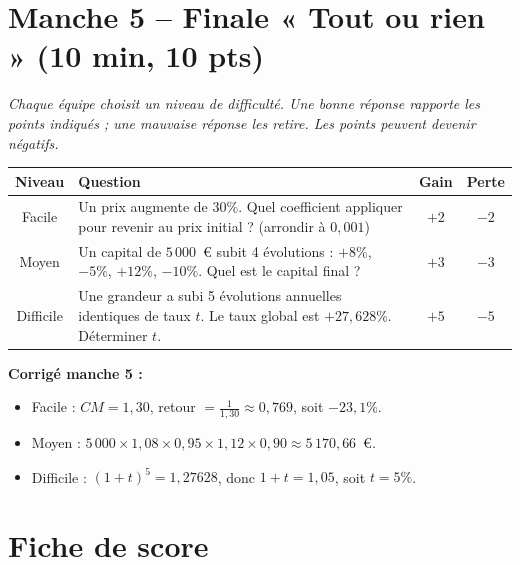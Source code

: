 \documentclass[12pt,a4paper]{article}
\begin{document}
\newpage

\section*{Manche 5 -- Finale « Tout ou rien » (10 min, 10 pts)}

\textit{Chaque équipe choisit un niveau de difficulté. Une bonne réponse rapporte les points indiqués ; une mauvaise réponse les retire. Les points peuvent devenir négatifs.}

\vspace{0.3cm}

\begin{center}
\renewcommand{\arraystretch}{1.5}
\begin{tabular}{|c|p{9cm}|c|c|}
\hline
\textbf{Niveau} & \textbf{Question} & \textbf{Gain} & \textbf{Perte} \\
\hline
Facile & Un prix augmente de \(30\%\). Quel coefficient appliquer pour revenir au prix initial ? (arrondir à \(0{,}001\)) & \(+2\) & \(-2\) \\
\hline
Moyen & Un capital de \(5\,000\)~\euro{} subit 4 évolutions : \(+8\%\), \(-5\%\), \(+12\%\), \(-10\%\). Quel est le capital final ? & \(+3\) & \(-3\) \\
\hline
Difficile & Une grandeur a subi 5 évolutions annuelles identiques de taux \(t\). Le taux global est \(+27{,}628\%\). Déterminer \(t\). & \(+5\) & \(-5\) \\
\hline
\end{tabular}
\end{center}

\vspace{0.3cm}
\textbf{Corrigé manche 5 :}
\begin{itemize}
    \item Facile : \(CM = 1{,}30\), retour \(= \frac{1}{1{,}30} \approx 0{,}769\), soit \(-23{,}1\%\).
    \item Moyen : \(5\,000 \times 1{,}08 \times 0{,}95 \times 1{,}12 \times 0{,}90 \approx 5\,170{,}66\)~\euro{}.
    \item Difficile : \((1+t)^5 = 1{,}27628\), donc \(1+t = 1{,}05\), soit \(t = 5\%\).
\end{itemize}

\newpage

\section*{Fiche de score}
\end{document}

